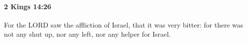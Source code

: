 
		\paragraph{2 Kings 14:26} %
			\label{2KINGS-14-26}

			For the LORD saw the affliction of Israel, that it was very bitter: for there was not any shut up, nor any left, nor any helper for Israel.


